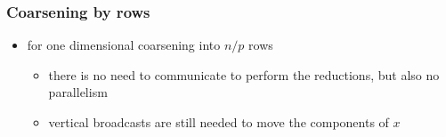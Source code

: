 \begin{frame}[fragile]
%
  \frametitle{Coarsening by rows}
%
  \begin{itemize}
%
  \item for one dimensional coarsening into $n/p$ rows
    \begin{itemize}
    \item there is no need to communicate to perform the reductions, but also no parallelism
    \item vertical broadcasts are still needed to move the components of $x$
    \end{itemize}
%
  \begin{center}
    \begin{minipage}{.85\linewidth}
      \begin{algorithm}[H]
%
        \dontprintsemicolon
        \nocaptionofalgo
        \setalcaphskip{0ex}
%
% 
      \end{algorithm}
    \end{minipage}
  \end{center}
%
  \end{itemize}
%
\end{frame}

